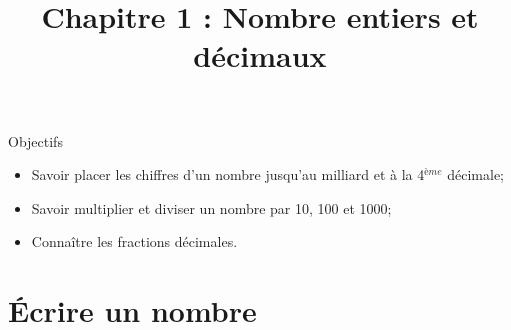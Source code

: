 \documentclass[xcolor={dvipsnames}]{beamer}
\title{Chapitre 1 : Nombre entiers et décimaux}
\begin{document}
\begin{frame}
  \titlepage 
\end{frame}


	
\begin{frame}
	\begin{block}{Objectifs}
		\begin{itemize}
			\item Savoir placer les chiffres d'un nombre jusqu'au milliard et à la 4$^{ème}$ décimale;
			\item Savoir multiplier et diviser un nombre par 10, 100 et 1000;
			\item Connaître les fractions décimales.		
		\end{itemize}
	\end{block}
\end{frame}


\section{\'Ecrire un nombre}
\end{document}
